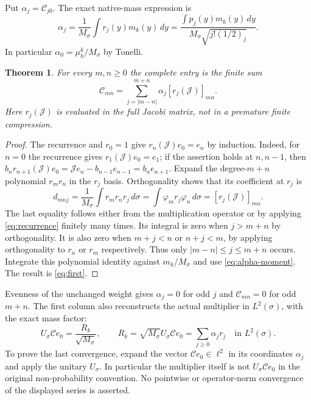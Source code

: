 \documentclass[11pt]{article}
\newtheorem{theorem}{Theorem}
\newcommand{\J}{\mathcal J}
\newcommand{\CC}{\mathcal C}
\begin{document}
Put $\alpha_j=\CC_{j0}$. The exact native-mass expression is
\begin{equation}\label{eq:alpha-moment}
 \alpha_j=\frac1{M_\sigma}\int r_j(y)m_k(y)\,dy
 =\frac{\int p_j(y)m_k(y)\,dy}
             {M_\sigma\sqrt{j!(1/2)_j}}.
\end{equation}
In particular $\alpha_0=\mu_h^k/M_\sigma$ by Tonelli.

\begin{theorem}\label{thm:first}
For every $m,n\geq0$ the complete entry is the finite sum
\begin{equation}\label{eq:first}
 \CC_{mn}=\sum_{j=|m-n|}^{m+n}\alpha_j[r_j(\J)]_{mn}.
\end{equation}
Here $r_j(\J)$ is evaluated in the full Jacobi matrix, not in a
premature finite compression.
\end{theorem}
\begin{proof}
The recurrence and $r_0=1$ give $r_n(\J)e_0=e_n$ by induction.
Indeed, for $n=0$ the recurrence gives $r_1(\J)e_0=e_1$; if the
assertion holds at $n,n-1$, then
$b_n r_{n+1}(\J)e_0=\J e_n-b_{n-1}e_{n-1}=b_ne_{n+1}$.
Expand the degree-$m+n$ polynomial $r_mr_n$ in the $r_j$ basis.
Orthogonality shows that its coefficient at $r_j$ is
\[
 d_{mnj}=\frac1{M_\sigma}\int r_mr_nr_j\,d\sigma
       =\int\varphi_m r_j\varphi_n\,d\sigma
       =[r_j(\J)]_{mn}.
\]
The last equality follows either from the multiplication operator
or by applying \eqref{eq:recurrence} finitely many times. Its
integral is zero when $j>m+n$ by orthogonality. It is also zero
when $m+j<n$ or $n+j<m$, by applying orthogonality to $r_n$ or
$r_m$ respectively. Thus only $|m-n|\leq j\leq m+n$ occurs.
Integrate this polynomial identity against $m_k/M_\sigma$ and
use \eqref{eq:alpha-moment}. The result is \eqref{eq:first}.
\end{proof}

Evenness of the unchanged weight gives $\alpha_j=0$ for odd $j$ and
$\CC_{mn}=0$ for odd $m+n$. The first column also reconstructs the
actual multiplier in $L^2(\sigma)$, with the exact mass factor:
\begin{equation}\label{eq:mass-caveat}
 U_\sigma\CC e_0=\frac{R_k}{\sqrt{M_\sigma}},\qquad
 R_k=\sqrt{M_\sigma}U_\sigma\CC e_0
       =\sum_{j\geq0}\alpha_jr_j\quad\text{in }L^2(\sigma).
\end{equation}
To prove the last convergence, expand the vector $\CC e_0\in\ell^2$
in its coordinates $\alpha_j$ and apply the unitary $U_\sigma$.
In particular the multiplier itself is not $U_\sigma\CC e_0$ in
the original non-probability convention. No pointwise or
operator-norm convergence of the displayed series is asserted.
\end{document}
